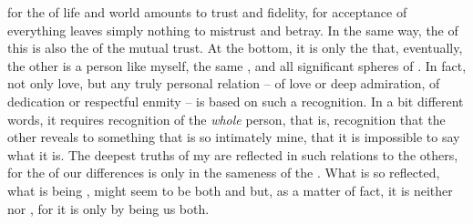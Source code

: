  for the  of life and world amounts to trust and
fidelity, for acceptance of everything leaves simply nothing to mistrust and
betray. In the same way, the  of this  is also the
 of the mutual trust. At the bottom, it is only the
 that, eventually, the other is a person like myself,
 the same ,  and all significant spheres of
.   In fact, not only love, but
any truly personal relation -- of love or deep admiration, of dedication or
respectful enmity -- is based on such a recognition. In a bit different words,
it requires recognition of the {\em whole} person, that is, recognition that the
other reveals to  something that is so intimately {mine}, that it is
impossible to say what  it is.
The deepest truths of my  are reflected in such
relations to the others, for the  of our differences is
 only in the sameness of the .  What is so
reflected, what is being , might seem to be both  and
 but, as a matter of fact, it is neither  nor , for
it is  only by being  us both.

